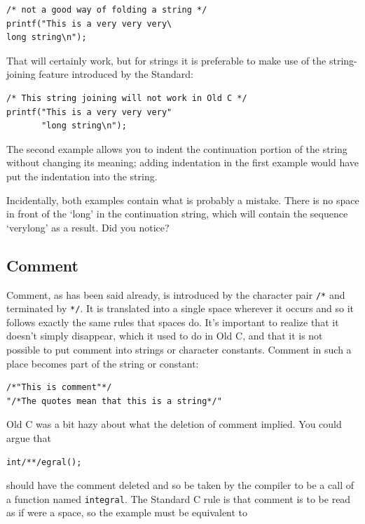    \begin{Verbatim}
/* not a good way of folding a string */
printf("This is a very very very\
long string\n");
\end{Verbatim}

   That will certainly work, but for strings it is preferable to make use
    of the string-joining feature introduced by the Standard:


   \begin{Verbatim}
/* This string joining will not work in Old C */
printf("This is a very very very"
       "long string\n");
\end{Verbatim}

   The second example allows you to indent the continuation portion of the
    string without changing its meaning; adding indentation in the first
    example would have put the indentation into the string.


   Incidentally, both examples contain what is probably a mistake. There
    is no space in front of the `long' in the continuation string,
    which will contain the sequence `verylong' as a result. Did you
    notice?


  

  \subsection{Comment}
   

   Comment, as has been said already, is introduced by the character
    pair \texttt{/*} and terminated by \texttt{*/}. It is
    translated into a single space wherever it occurs and so it follows
    exactly the same rules that spaces do. It's important to realize that it
    doesn't simply disappear, which it used to do in Old C, and that it
    is not possible to put comment into strings or character constants.
    Comment in such a place becomes part of the string or constant:


   \begin{Verbatim}
/*"This is comment"*/
"/*The quotes mean that this is a string*/"
\end{Verbatim}

   Old C was a bit hazy about what the deletion of comment implied.
    You could argue that


   \begin{Verbatim}
int/**/egral();
\end{Verbatim}

   should have the comment deleted and so be taken by the compiler to be a
    call of a function named \texttt{integral}. The Standard C rule is
    that comment is to be read as if were a space, so the example must be
    equivalent to


